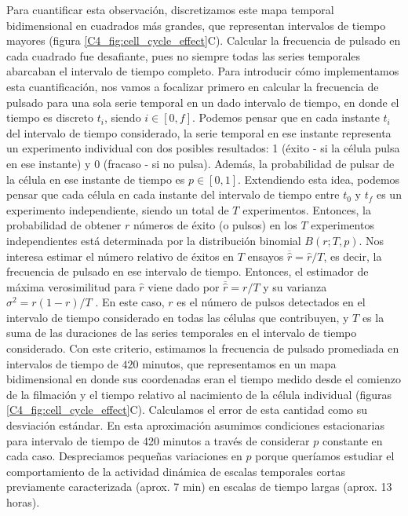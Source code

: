 \documentclass[./main.tex]{subfiles}
\begin{document}
Para cuantificar esta observación, discretizamos este mapa temporal bidimensional en cuadrados más grandes, que representan intervalos de tiempo mayores (figura \ref{C4_fig:cell_cycle_effect}C). Calcular la frecuencia de pulsado en cada cuadrado fue desafiante, pues no siempre todas las series temporales abarcaban el intervalo de tiempo completo. Para introducir cómo implementamos esta cuantificación, nos vamos a focalizar primero en calcular la frecuencia de pulsado para una sola serie temporal en un dado intervalo de tiempo, en donde el tiempo es discreto $t_i$, siendo $i \in [0,f]$. Podemos pensar que en cada instante $t_i$ del intervalo de tiempo considerado, la serie temporal en ese instante representa un experimento individual con dos posibles resultados: 1 (éxito - si la célula pulsa en ese instante) y 0 (fracaso - si no pulsa). Además, la probabilidad de pulsar de la célula en ese instante de tiempo es $p \in [0,1]$. Extendiendo esta idea, podemos pensar que cada célula en cada instante del intervalo de tiempo entre $t_0$ y $t_f$ es un experimento independiente, siendo un total de $T$  experimentos. Entonces, la probabilidad de obtener $r$ números de éxito (o pulsos) en los $T$ experimentos independientes está determinada por la distribución binomial $B(r;T,p)$. Nos interesa estimar el número relativo de éxitos en $T$ ensayos $\overline{\hat{r}}= \hat{r}/T$, es decir, la frecuencia de pulsado en ese intervalo de tiempo. Entonces, el estimador de máxima verosimilitud para $\hat{r}$ viene dado por $\overline{\hat{r}}= r/T$ y su varianza $\sigma^2 =  r (1-r)/T$ \cite{Frodesen1979}. En este caso, $r$ es el número de pulsos detectados en el intervalo de tiempo considerado en todas las células que contribuyen, y $T$ es la suma de las duraciones de las series temporales en el intervalo de tiempo considerado. Con este criterio, estimamos la frecuencia de pulsado promediada en intervalos de tiempo de $420$ minutos, que representamos en un mapa bidimensional en donde sus coordenadas eran el tiempo medido desde el comienzo de la filmación y el tiempo relativo al nacimiento de la célula individual (figuras \ref{C4_fig:cell_cycle_effect}C). Calculamos el error de esta cantidad como su desviación estándar. En esta aproximación asumimos condiciones estacionarias para intervalo de tiempo de 420 minutos a través de considerar $p$ constante en cada caso. Despreciamos pequeñas variaciones en $p$ porque queríamos estudiar el comportamiento de la actividad dinámica de escalas temporales cortas previamente caracterizada (aprox. 7 min) en escalas de tiempo largas (aprox. 13 horas). 
\end{document}
